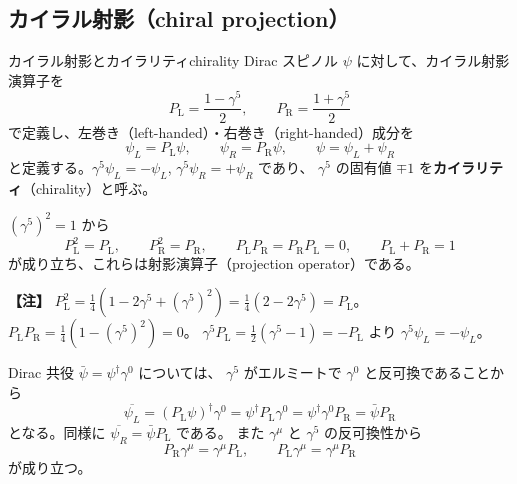 \documentclass[uplatex,dvipdfmx,a4paper,11pt,openany]{jsbook}
\newcommand{\term}[2]{\textbf{#1}（#2）}
\newcommand{\en}[1]{（#1）}
\newenvironment{note}{\vspace{1ex}\par\footnotesize\noindent\textbf{【注】}}{\par\vspace{1ex}}
\numberwithin{equation}{chapter}
\theoremstyle{definition}
\theoremstyle{plain}
\theoremstyle{remark}
\newcommand{\PL}{P_{\mathrm{L}}}
\newcommand{\PR}{P_{\mathrm{R}}}
\begin{document}
\subsection{カイラル射影（chiral projection）}
\begin{mydef}{カイラル射影とカイラリティ}{chirality}
Dirac スピノル $\psi$ に対して、カイラル射影演算子を
\begin{equation}
\PL=\frac{1-\gamma^5}{2},
\qquad
\PR=\frac{1+\gamma^5}{2}
\end{equation}
で定義し、左巻き\en{left-handed}・右巻き\en{right-handed}成分を
\begin{equation}
\psi_L=\PL\psi,\qquad \psi_R=\PR\psi,
\qquad
\psi=\psi_L+\psi_R
\end{equation}
と定義する。$\gamma^5\psi_L=-\psi_L$, $\gamma^5\psi_R=+\psi_R$ であり、
$\gamma^5$ の固有値 $\mp1$ を\term{カイラリティ}{chirality}と呼ぶ。
\end{mydef}
$(\gamma^5)^2=1$ から
\begin{equation}
\PL^2=\PL,\qquad \PR^2=\PR,\qquad
\PL\PR=\PR\PL=0,\qquad
\PL+\PR=1
\end{equation}
が成り立ち、これらは射影演算子\en{projection operator}である。
\begin{note}
$\PL^2=\frac14(1-2\gamma^5+(\gamma^5)^2)=\frac14(2-2\gamma^5)=\PL$。
$\PL\PR=\frac14(1-(\gamma^5)^2)=0$。
$\gamma^5\PL=\frac12(\gamma^5-1)=-\PL$ より $\gamma^5\psi_L=-\psi_L$。
\end{note}
Dirac 共役 $\bar\psi=\psi^\dagger\gamma^0$ については、
$\gamma^5$ がエルミートで $\gamma^0$ と反可換であることから
\begin{equation}
\overline{\psi_L}
=(\PL\psi)^\dagger\gamma^0
=\psi^\dagger\PL\gamma^0
=\psi^\dagger\gamma^0\PR
=\bar\psi\PR
\end{equation}
となる。同様に $\overline{\psi_R}=\bar\psi\PL$ である。
また $\gamma^\mu$ と $\gamma^5$ の反可換性から
\begin{equation}
\PR\gamma^\mu=\gamma^\mu\PL,\qquad
\PL\gamma^\mu=\gamma^\mu\PR
\end{equation}
が成り立つ。
\end{document}
